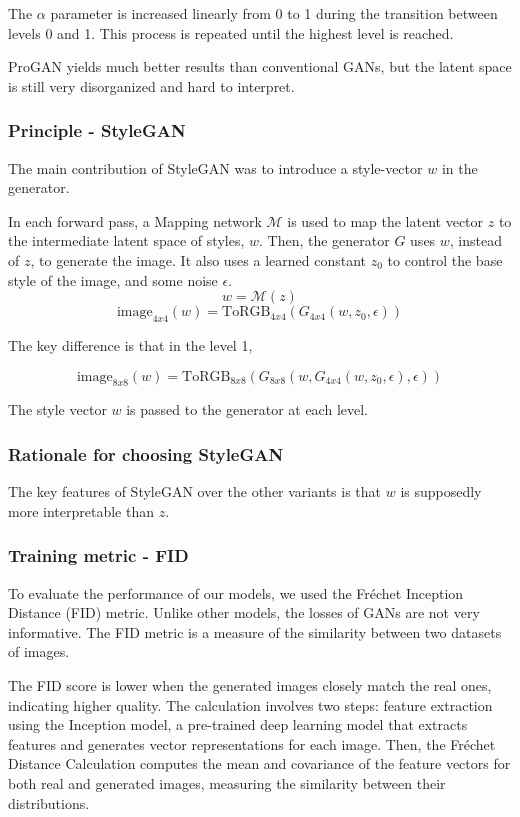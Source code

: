 \documentclass{article}
\begin{document}
The $\alpha$ parameter is increased linearly from 0 to 1 during the transition between levels 0 and 1. This process is repeated until the highest level is reached. 

ProGAN yields much better results than conventional GANs, but the latent space is still very disorganized and hard to interpret.

\subsubsection*{Principle - StyleGAN}

The main contribution of StyleGAN was to introduce a style-vector $w$ in the generator.

In each forward pass, a Mapping network $\mathcal{M}$ is used to map the latent vector $z$ to the intermediate latent space of styles, $w$.
Then, the generator $G$ uses $w$, instead of $z$, to generate the image. It also uses a learned constant $z_0$ to control the base style of the image, and some noise $\epsilon$.
\[w = \mathcal{M}(z)\]
\[\text{image}_{4x4}(w) = \text{ToRGB}_{4x4}(G_{4x4}(w, z_0, \epsilon))\]

The key difference is that in the level 1, 

\[\text{image}_{8x8}(w) = \text{ToRGB}_{8x8}(G_{8x8}(w, G_{4x4}(w, z_0, \epsilon), \epsilon))\]

The style vector $w$ is passed to the generator at each level.

\subsubsection*{Rationale for choosing StyleGAN}

The key features of StyleGAN over the other variants is that $w$ is supposedly more interpretable than $z$.

\subsubsection*{Training metric - FID}

\quad To evaluate the performance of our models, we used the Fréchet Inception Distance (FID) metric. Unlike other models, the losses of GANs are not very informative. The FID metric is a measure of the similarity between two datasets of images. 

The FID score is lower when the generated images closely match the real ones, indicating higher quality. 
The calculation involves two steps: feature extraction using the Inception model, a pre-trained deep learning model that extracts features and generates vector representations for each image. 
Then, the Fréchet Distance Calculation computes the mean and covariance of the feature vectors for both real and generated images, measuring the similarity between their distributions.
\end{document}
